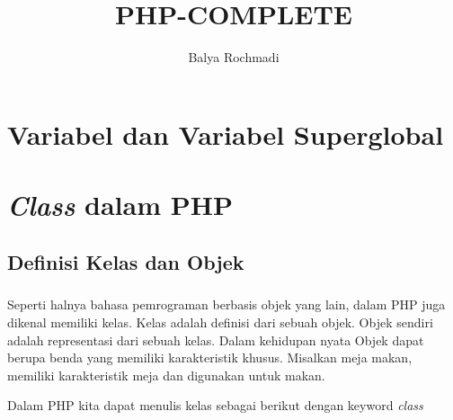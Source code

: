 \documentclass[12pt,a4paper]{book}
\author{Balya Rochmadi}
\title{PHP-COMPLETE}
\begin{document}
	\maketitle
	\tableofcontents
	\Large
	\chapter{Variabel dan Variabel Superglobal}

	\chapter{\textit{Class} dalam PHP}
	
	\section{Definisi Kelas dan Objek}
	
	\paragraph{}
	
	Seperti halnya bahasa pemrograman berbasis objek yang lain, dalam PHP juga dikenal memiliki kelas. Kelas adalah definisi dari sebuah objek. Objek sendiri adalah representasi dari sebuah kelas. Dalam kehidupan nyata Objek dapat berupa benda yang memiliki karakteristik khusus. Misalkan meja makan, memiliki karakteristik meja dan digunakan untuk makan. 
	
	Dalam PHP kita dapat menulis kelas sebagai berikut dengan keyword \textit{class}
	
\end{document}
